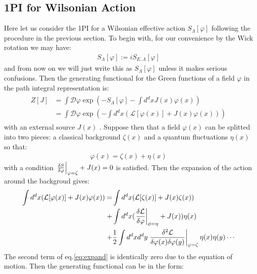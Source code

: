 \subsection{1PI for Wilsonian Action}
Here let us consider the 1PI for a Wilsonian effective action $S_{\Lambda} [\varphi]$ following the procedure in the previous section. To begin with, for our convenience by the Wick rotation we may have:
\begin{align}
    S_{\Lambda}[\varphi] := iS_{E,\Lambda}[\varphi]
\end{align}
and from now on we will just write this as $S_{\Lambda}[\varphi]$ unless it makes serious confusions. Then the generating functional for the Green functions of a field $\varphi$ in the path integral representation is:
\begin{align}
    \begin{split}
        Z[J] &= \int \mathcal{D}\varphi \exp (-S_{\Lambda} [\varphi] - \int d^{d}x J(x)\varphi(x)) \\
        & = \int \mathcal{D} \varphi \exp (-\int d^{d}x (\mathcal{L} [\varphi(x)] + J(x)\varphi(x)))
    \end{split}
\end{align}
with an external source $J(x)$ \parencite{srednicki_quantum_2007, zee_quantum_2003, weinberg_quantum_1996}. Suppose then that a field $\varphi (x)$ can be splitted into two pieces: a classical background $\zeta(x)$ and a quantum fluctuations $\eta (x)$ so that:
\begin{align}
    \varphi(x) = \zeta(x) + \eta(x)
\end{align}  
with a condition $\eval{\fdv{S}{\varphi}} _{\varphi = \zeta} + J(x) = 0$ is satisfied. Then the expansion of the action around the backgroud gives:
\begin{align}
    \label{eq:expand}
    \begin{split}
    \int d^{d} x  (\mathcal{L}[\varphi(x)] + J(x) \varphi(x) ) = & \int d^{d}x  (\mathcal{L}[\zeta(x)] + J(x)\zeta(x))  \\
    + & \int d^{d} x (\eval{\fdv{\mathcal{L}}{\varphi}} _{\phi = \eta} + J(x)) \eta(x) \\
    + & \frac{1}{2} \int d^{d}x d^{d}y \eval {\frac{\delta ^{2} \mathcal{L}}{\delta \varphi(x) \delta \varphi(y)}} _{\varphi = \zeta} \eta(x)\eta(y) \cdots 
    \end{split}
\end{align}
The second term of eq.\ref{eq:expand} is identically zero due to the equation of motion. Then the generating functional can be in the form:
